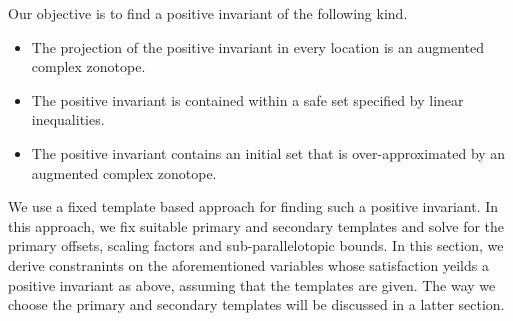 
Our objective is to find a positive invariant of the following kind.
\begin{itemize}
\item The projection of the positive invariant in every location is an augmented complex zonotope.
\item The positive invariant is contained within a safe set specified by linear inequalities.
\item The positive invariant contains an initial set that is over-approximated by an augmented complex zonotope.
\end{itemize} 
We use a fixed template based approach for finding such a positive
invariant.  In this approach, we fix suitable primary and secondary
templates and solve for the primary offsets, scaling factors and
sub-parallelotopic bounds.  In this section, we derive constranints on
the aforementioned variables whose satisfaction yeilds a positive
invariant as above, assuming that the templates are given.  The way we
choose the primary and secondary templates will be discussed in a
latter section.


